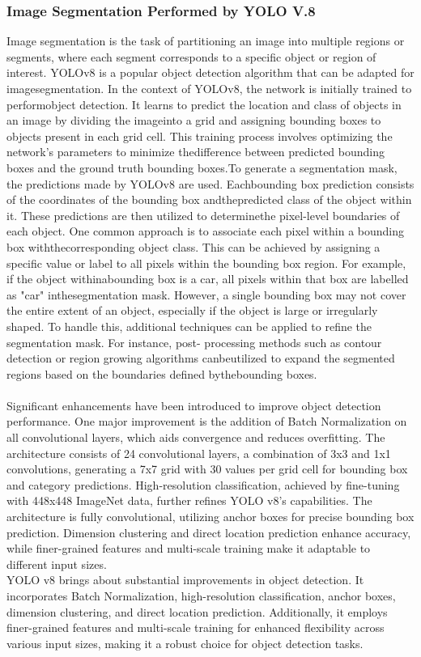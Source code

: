 \documentclass[letterpaper, 10 pt, conference]{ieeeconf}  %
\begin{document}
\subsubsection{Image Segmentation Performed by YOLO V.8}
Image segmentation is the task of partitioning an image into multiple regions or
segments, where each segment corresponds to a specific object or region of interest. YOLOv8 is a popular object detection algorithm that can be adapted for imagesegmentation. In the context of YOLOv8, the network is initially trained to performobject detection. It learns to predict the location and class of objects in an image by dividing the imageinto a grid and assigning bounding boxes to objects present in each grid cell. This
training process involves optimizing the network's parameters to minimize thedifference between predicted bounding boxes and the ground truth bounding boxes.To generate a segmentation mask, the predictions made by YOLOv8 are used. Eachbounding box prediction consists of the coordinates of the bounding box andthepredicted class of the object within it. These predictions are then utilized to determinethe pixel-level boundaries of each object. One common approach is to associate each pixel within a bounding box withthecorresponding object class. This can be achieved by assigning a specific value or label
to all pixels within the bounding box region. For example, if the object withinabounding box is a car, all pixels within that box are labelled as "car" inthesegmentation mask. However, a single bounding box may not cover the entire extent of an object, especially if the object is large or irregularly shaped. To handle this, additional
techniques can be applied to refine the segmentation mask. For instance, post- processing methods such as contour detection or region growing algorithms canbeutilized to expand the segmented regions based on the boundaries defined bythebounding boxes. \\ \\
Significant enhancements have been introduced to improve object detection performance. One major improvement is the addition of Batch Normalization on all convolutional layers, which aids convergence and reduces overfitting. The architecture consists of 24 convolutional layers, a combination of 3x3 and 1x1 convolutions, generating a 7x7 grid with 30 values per grid cell for bounding box and category predictions. High-resolution classification, achieved by fine-tuning with 448x448 ImageNet data, further refines YOLO v8's capabilities. The architecture is fully convolutional, utilizing anchor boxes for precise bounding box prediction. Dimension clustering and direct location prediction enhance accuracy, while finer-grained features and multi-scale training make it adaptable to different input sizes. \\ YOLO v8 brings about substantial improvements in object detection. It incorporates Batch Normalization, high-resolution classification, anchor boxes, dimension clustering, and direct location prediction. Additionally, it employs finer-grained features and multi-scale training for enhanced flexibility across various input sizes, making it a robust choice for object detection tasks.\cite{c1}\\
\end{document}
